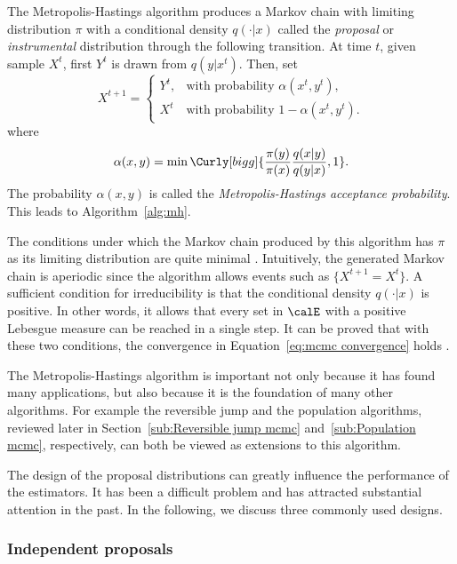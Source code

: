 The Metropolis-Hastings algorithm produces a Markov chain with limiting
distribution $\pi$ with a conditional density $q(\cdot|x)$ called the
\emph{proposal} or \emph{instrumental} distribution through the following
transition. At time $t$, given sample $X^t$, first $Y^t$ is drawn from
$q(y|x^t)$. Then, set
\begin{equation*}
  X^{t+1} =
  \begin{cases}
    Y^t, &\text{with probability } \alpha(x^t,y^t),\\
    X^t  &\text{with probability } 1 - \alpha(x^t,y^t).
  \end{cases}
\end{equation*}
where
\begin{equation}
  \alpha(x,y) =
  \min\Curly[bigg]{\frac{\pi(y)}{\pi(x)}\frac{q(x|y)}{q(y|x)},1}.
\end{equation}
The probability $\alpha(x,y)$ is called the \emph{Metropolis-Hastings
  acceptance probability}. This leads to Algorithm~\ref{alg:mh}.



The conditions under which the Markov chain produced by this algorithm has
$\pi$ as its limiting distribution are quite minimal
\cite[][sec.~7.3.2]{Robert:2004tn}. Intuitively, the generated Markov chain is
aperiodic since the algorithm allows events such as $\{X^{t+1} = X^t\}$. A
sufficient condition for irreducibility is that the conditional density
$q(\cdot|x)$ is positive. In other words, it allows that every set in $\calE$
with a positive Lebesgue measure can be reached in a single step. It can be
proved that with these two conditions, the convergence in
Equation~\eqref{eq:mcmc convergence} holds \cite[][Theorem~7.4 and
Corollary~7.5]{Robert:2004tn}.

The Metropolis-Hastings algorithm is important not only because it has found
many applications, but also because it is the foundation of many other
algorithms. For example the reversible jump \mcmc and the population \mcmc
algorithms, reviewed later in Section~\ref{sub:Reversible jump mcmc}
and~\ref{sub:Population mcmc}, respectively, can both be viewed as extensions
to this algorithm.

The design of the proposal distributions can greatly influence the performance
of the estimators. It has been a difficult problem and has attracted
substantial attention in the past. In the following, we discuss three commonly
used designs.

\subsubsection{Independent proposals}
\label{ssub:Independent proposals}


